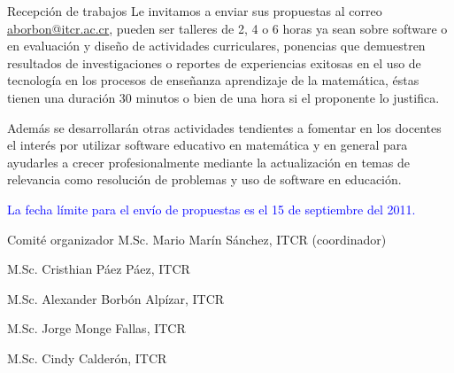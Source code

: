 \documentclass[x11names,table,usenames,dvipsnames]{beamer}
\begin{document}
\begin{frame}[plain]{}
\begin{columns}[t]
\begin{column}{.48\linewidth}
\begin{block}{Recepción de trabajos}
Le invitamos a enviar sus propuestas al correo \url{aborbon@itcr.ac.cr}, pueden ser talleres de 2, 4 o 6 horas ya sean sobre software o en evaluación  y diseño de actividades curriculares, ponencias que demuestren resultados de investigaciones o reportes de experiencias exitosas en el uso de tecnología en los procesos de enseñanza aprendizaje de la  matemática, éstas  tienen una duración  30 minutos o bien de una hora si el proponente lo justifica. 

Además se desarrollarán otras actividades tendientes a fomentar en los docentes el interés por utilizar software educativo en matemática y en general para ayudarles a crecer profesionalmente mediante la actualización en temas de relevancia como resolución de problemas y uso de software en educación. 

\textcolor{Blue}{La fecha límite para el envío de propuestas es el 15  de septiembre del 2011.}
        \end{block}
        
        \begin{block}{Comité organizador}
M.Sc. Mario Marín Sánchez, ITCR (coordinador)

M.Sc. Cristhian Páez Páez, ITCR

M.Sc. Alexander Borbón Alpízar, ITCR

M.Sc. Jorge Monge Fallas, ITCR

M.Sc. Cindy Calderón, ITCR


\end{block}
\end{column}
\end{columns}
\end{frame}
\end{document}
